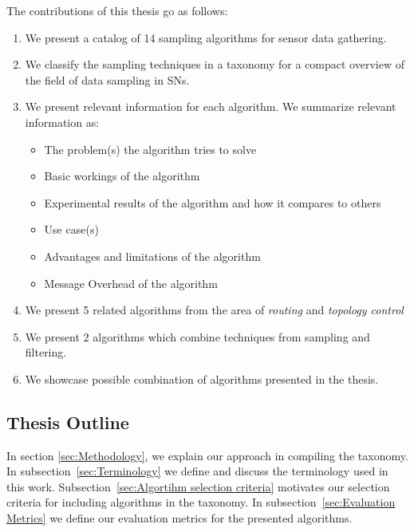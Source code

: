 The contributions of this thesis go as follows: 
\begin{enumerate}
    \item We present a catalog of 14 sampling algorithms for sensor data
    gathering.
    \item We classify the sampling techniques in a taxonomy for a compact
    overview of the field of data sampling in \acp{SN}.
    \item We present relevant information for each algorithm. We summarize
    relevant information as:

        \begin{itemize}
            \item The problem(s) the algorithm tries to solve
            \item Basic workings of the algorithm
            \item Experimental results of the algorithm and how it compares to others
            \item Use case(s)
            \item Advantages and limitations of the algorithm
            \item Message Overhead of the algorithm
        \end{itemize}

    \item We present 5 related algorithms from the area of \textit{routing}
    and \textit{topology control}

    \item We present 2 algorithms which combine techniques from sampling and
    filtering.

    \item We showcase possible combination of algorithms presented in the
    thesis.

\end{enumerate}


\subsection{Thesis Outline}

  In section \ref{sec:Methodology}, we
explain our approach in compiling the taxonomy. In
subsection~\ref{sec:Terminology} we define and discuss the terminology used in
this work. Subsection~\ref{sec:Algortihm selection criteria} motivates our
selection criteria for including algorithms in the taxonomy. In
subsection~\ref{sec:Evaluation Metrics} we define our evaluation metrics for
the presented algorithms.

